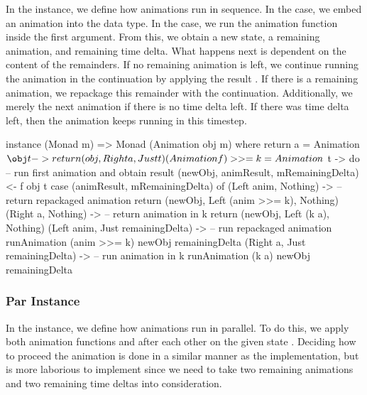 In the  instance, we define how animations run in sequence. In the  case, we embed an animation into the  data type. In the \hs{>>=} case, we run the animation function inside the first argument. From this, we obtain a new state, a remaining animation, and remaining time delta. What happens next is dependent on the content of the remainders. If no remaining animation is left, we continue running the animation in the continuation  by applying the result . If there is a remaining animation, we repackage this remainder with the continuation. Additionally, we merely  the next animation if there is no time delta left. If there was time delta left, then the animation keeps running in this timestep.

\begin{code}
instance (Monad m) => Monad (Animation obj m) where
  return a = Animation $ \obj t -> return (obj, Right a, Just t)
  (Animation f) >>= k = Animation $ \obj t -> do
    -- run first animation and obtain result
    (newObj, animResult, mRemainingDelta) <- f obj t
    case (animResult, mRemainingDelta) of
      (Left anim, Nothing) -> -- return repackaged animation
        return (newObj, Left (anim >>= k), Nothing)
      (Right a, Nothing) -> -- return animation in k
        return (newObj, Left (k a), Nothing)
      (Left anim, Just remainingDelta) -> -- run repackaged animation
        runAnimation (anim >>= k) newObj remainingDelta
      (Right a, Just remainingDelta) -> -- run animation in k
        runAnimation (k a) newObj remainingDelta
\end{code}

\subsubsection{Par Instance}

In the  instance, we define how animations run in parallel. To do this, we apply both animation functions  and  after each other on the given state . Deciding how to proceed the animation is done in a similar manner as the  implementation, but is more laborious to implement since we need to take two remaining animations and two remaining time deltas into consideration.

